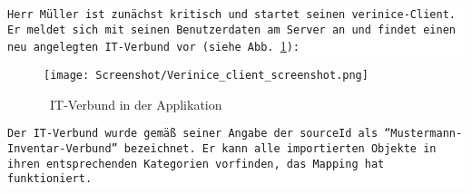 \documentclass[a4paper,10pt]{book}
\begin{document}
\newline\newline
\colorbox{white}{\parbox{\textwidth}{
{\tt Herr Müller ist zunächst kritisch und startet seinen verinice-Client. Er meldet sich mit seinen Benutzerdaten am Server an und findet einen neu
angelegten IT-Verbund vor (siehe Abb. \ref{IT-Verbund in der Applikation}):}
}}\newline\newline
\begin{figure}[htb!]
  \centering
  \texttt{[image: Screenshot/Verinice\_client\_screenshot.png]}
  \caption{\label{IT-Verbund in der Applikation} \ IT-Verbund in der Applikation}
\end{figure}
\newline
\newline
\colorbox{white}{\parbox{\textwidth}{
{\tt Der IT-Verbund wurde gemäß seiner Angabe der sourceId als ``Mustermann-Inventar-Verbund'' bezeichnet. Er kann alle importierten Objekte in
ihren entsprechenden Kategorien vorfinden, das Mapping hat funktioniert.}
}}\newline\newline
\end{document}
